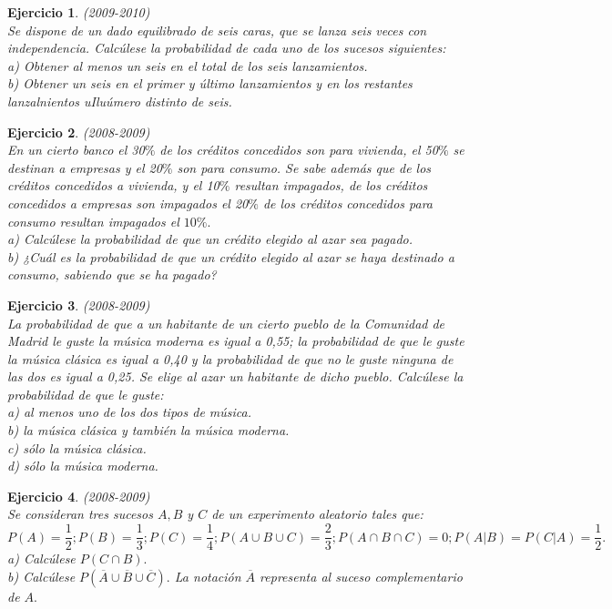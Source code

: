 \documentclass[12pt, a4paper]{amsart}
\newtheorem{ejer}{Ejercicio}
\begin{document}
\begin{ejer}\em (2009-2010)\\
Se dispone de un dado equilibrado de seis caras, que se lanza seis veces con independencia.
Calcúlese la probabilidad de cada uno de los sucesos siguientes:\\
a) Obtener al menos un seis en el total de los seis lanzamientos.\\
b) Obtener un seis en el primer y último lanzamientos y en los restantes lanzalnientos uIluúmero
distinto de seis.
\end{ejer}

\begin{ejer}\em (2008-2009)\\%
En un cierto banco el 30$\%$ de los créditos concedidos son para vivienda, el 50$\%$ se destinan a empresas y el 20$\%$ son para consumo. Se sabe además que de los créditos concedidos a vivienda, y el 10$\%$ resultan impagados, de los créditos concedidos a empresas son impagados el 20$\%$ de los créditos concedidos para consumo resultan impagados el $10\%.$\\
a) Calcúlese la probabilidad de que un crédito elegido al azar sea pagado.\\
b) ¿Cuál es la probabilidad de que un crédito elegido al azar se haya destinado a consumo, sabiendo que se ha pagado?
\end{ejer}

\begin{ejer}\em (2008-2009)\\
La probabilidad de que a un habitante de un cierto pueblo de la Comunidad de Madrid le guste la música moderna es igual a 0,55; la probabilidad de que le guste la música clásica es igual a 0,40 y la probabilidad de que no le guste ninguna de las dos es igual a 0,25. Se elige al azar un habitante de dicho pueblo. Calcúlese la probabilidad de que le guste:\\
a) al menos uno de los dos tipos de música.\\
b) la música clásica y también la música moderna.\\
c) sólo la música clásica.\\
d) sólo la música moderna.
\end{ejer}

\begin{ejer}\em (2008-2009)\\
Se consideran tres sucesos $A, B$ y $C$ de un experimento aleatorio tales que:
\[P(A)=\frac{1}{2}; P(B)=\frac{1}{3}; P(C)=\frac{1}{4}; P(A\cup B\cup C)=\frac{2}{3};P(A\cap B\cap C)=0; P(A|B)=P(C|A)=\frac{1}{2}.\]
a) Calcúlese $P(C\cap B).$\\
b) Calcúlese $P(\overline{A}\cup\overline{B}\cup\overline{C}).$ La notación $\overline{A}$ representa al suceso complementario de $A.$
\end{ejer}
\end{document}
